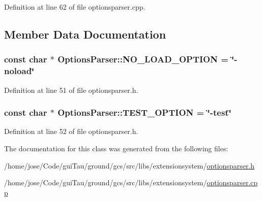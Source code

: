 Definition at line 62 of file optionsparser.\-cpp.



\subsection{Member Data Documentation}
\hypertarget{class_extension_system_1_1_internal_1_1_options_parser_a4750d20fa380d4217b6247d0953ea975}{
\subsubsection[{N\-O\-\_\-\-L\-O\-A\-D\-\_\-\-O\-P\-T\-I\-O\-N}]{\setlength{\rightskip}{0pt plus 5cm}const char $\ast$ Options\-Parser\-::\-N\-O\-\_\-\-L\-O\-A\-D\-\_\-\-O\-P\-T\-I\-O\-N = \char`\"{}-\/noload\char`\"{}\hspace{0.3cm}{\ttfamily [static]}}}\label{class_extension_system_1_1_internal_1_1_options_parser_a4750d20fa380d4217b6247d0953ea975}


Definition at line 51 of file optionsparser.\-h.

\hypertarget{class_extension_system_1_1_internal_1_1_options_parser_a0fa18d9e88d365b1a49705ed70e87a90}{
\subsubsection[{T\-E\-S\-T\-\_\-\-O\-P\-T\-I\-O\-N}]{\setlength{\rightskip}{0pt plus 5cm}const char $\ast$ Options\-Parser\-::\-T\-E\-S\-T\-\_\-\-O\-P\-T\-I\-O\-N = \char`\"{}-\/test\char`\"{}\hspace{0.3cm}{\ttfamily [static]}}}\label{class_extension_system_1_1_internal_1_1_options_parser_a0fa18d9e88d365b1a49705ed70e87a90}


Definition at line 52 of file optionsparser.\-h.



The documentation for this class was generated from the following files\-:\begin{DoxyCompactItemize}
\item 
/home/jose/\-Code/gui\-Tau/ground/gcs/src/libs/extensionsystem/\hyperlink{optionsparser_8h}{optionsparser.\-h}\item 
/home/jose/\-Code/gui\-Tau/ground/gcs/src/libs/extensionsystem/\hyperlink{optionsparser_8cpp}{optionsparser.\-cpp}\end{DoxyCompactItemize}
